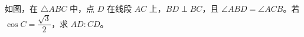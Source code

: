 \documentclass{exam-zh}
\begin{document}

\begin{problem}[points=12]
  \noindent
  \begin{minipage}[t]{\dimexpr\linewidth-60mm-6mm\relax}
    \vspace{0pt}
    如图，在 $\triangle ABC$ 中，点 $D$ 在线段 $AC$ 上，$BD\perp BC$，且
$\angle ABD=\angle ACB$。若 $\cos C=\dfrac{\sqrt3}{2}$，求 $AD:CD$。

    
  \end{minipage}\hfill
  \begin{diagramcoltikz}{60mm}{第 4 题图}
  }
  \end{diagramcoltikz}
  \par\medskip
  \answerarea[50mm]
\end{problem}
\end{document}
